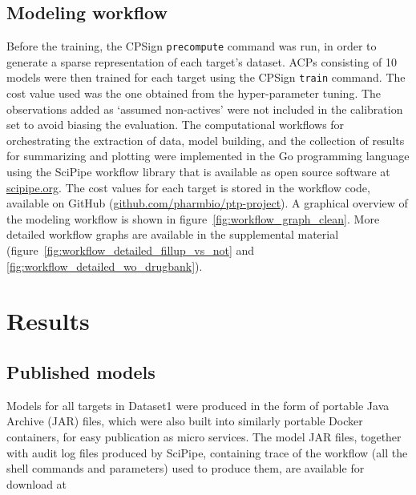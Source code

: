\documentclass[utf8]{frontiersSCNS} %
\begin{document}
\subsection*{Modeling workflow}
Before the training, the CPSign \texttt{precompute} command was run, in order
to generate a sparse representation of each target's dataset.  ACPs consisting
of 10 models were then trained for each target using the CPSign \texttt{train}
command. The cost value used was the one obtained from the hyper-parameter
tuning. The observations added as `assumed non-actives' were not included in
the calibration set to avoid biasing the evaluation.
The computational workflows for orchestrating the extraction of data, model
building, and the collection of results for summarizing and plotting were
implemented in the Go programming language using the SciPipe workflow library
that is available as open source software at
\href{http://scipipe.org}{scipipe.org}.  The cost values for each target is
stored in the workflow code, available on GitHub
(\href{https://github.com/pharmbio/ptp-project}{github.com/pharmbio/ptp-project}).
A graphical overview of the modeling workflow is shown in
figure~\ref{fig:workflow_graph_clean}. More detailed workflow graphs are
available in the supplemental material
(figure~\ref{fig:workflow_detailed_fillup_vs_not} and
\ref{fig:workflow_detailed_wo_drugbank}).





\section*{Results}

\subsection*{Published models}
Models for all targets in Dataset1 were produced in the form of portable Java
Archive (JAR) files, which were also built into similarly portable Docker
containers, for easy publication as micro services.  The model JAR files,
together with audit log files produced by SciPipe, containing trace of the
workflow (all the shell commands and parameters) used to produce them, are
available for download at~\cite{ModelsZenodo}
\end{document}
